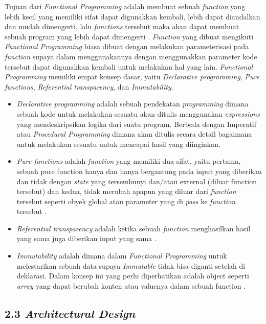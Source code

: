 \documentclass[a4paper]{article}
\begin{document}
Tujuan dari \textit{Functional Programming} adalah membuat sebuah \textit{function} yang lebih kecil yang memiliki sifat dapat digunakkan kembali, lebih dapat diandalkan dan mudah dimengerti, lalu \textit{functions} tersebut maka akan dapat membuat sebuah program yang lebih dapat dimengerti \autocite{atencio2016functional}. \textit{Function} yang dibuat mengikuti \textit{Functional Programming} biasa dibuat dengan melakukan parameterisasi pada \textit{function} supaya dalam menggunakannya dengan menggunakkan parameter kode tersebut dapat digunakkan kembali untuk melakukan hal yang lain. \textit{Functional Programming} memiliki empat konsep dasar, yaitu \textit{Declarative programming}, \textit{Pure functions}, \textit{Referential transparency}, dan \textit{Immutability}\autocite{atencio2016functional}.


\begin{itemize}
    \item \textit{Declarative programming} adalah sebuah pendekatan \textit{programming} dimana sebuah kode untuk melakukan sesuatu akan ditulis menggunakan \textit{expressions} yang mendeskripsikan logika dari suatu program. Berbeda dengan Imperatif atau \textit{Procedural Programming} dimana akan ditulis secara detail bagaimana untuk melakukan sesuatu untuk mencapai hasil yang diinginkan\autocite{atencio2016functional}. 
    \item \textit{Pure functions} adalah \textit{function} yang memiliki dua sifat, yaitu pertama, sebuah pure function hanya dan hanya bergantung pada input yang diberikan dan tidak dengan \textit{state} yang tersembunyi dan/atau external (diluar function tersebut) dan kedua, tidak merubah apapun yang diluar dari \textit{function} tersebut seperti obyek global atau parameter yang di \textit{pass} ke \textit{function} tersebut \autocite{atencio2016functional}. 
    \item \textit{Referential transparency} adalah ketika sebuah \textit{function} menghasilkan hasil yang sama juga diberikan input yang sama \autocite{atencio2016functional}.
    \item \textit{Immutability} adalah dimana dalam \textit{Functional Programming} untuk melestarikan sebuah data supaya \textit{Immutable} tidak bisa diganti setelah di deklarasi. Dalam konsep ini yang perlu diperhatikan adalah object seperti \textit{array} yang dapat berubah konten atau valuenya dalam sebuah function \autocite{atencio2016functional}.  
\end{itemize}

\subsection*{2.3 \textit{Architectural Design}}
\end{document}
